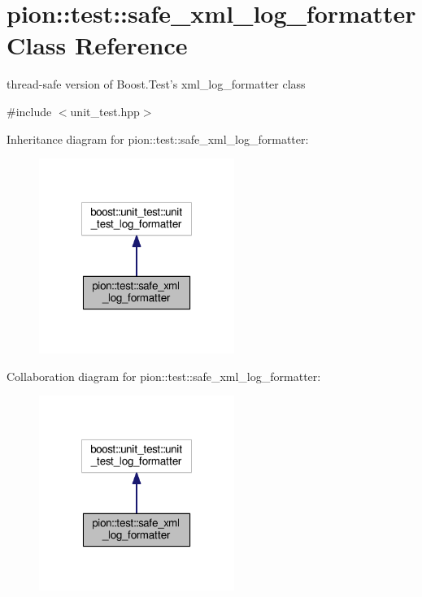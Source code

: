 \hypertarget{classpion_1_1test_1_1safe__xml__log__formatter}{\section{pion\-:\-:test\-:\-:safe\-\_\-xml\-\_\-log\-\_\-formatter Class Reference}
\label{classpion_1_1test_1_1safe__xml__log__formatter}
}


thread-\/safe version of Boost.\-Test's xml\-\_\-log\-\_\-formatter class  




{\ttfamily \#include $<$unit\-\_\-test.\-hpp$>$}



Inheritance diagram for pion\-:\-:test\-:\-:safe\-\_\-xml\-\_\-log\-\_\-formatter\-:
\nopagebreak
\begin{figure}[H]
\begin{center}
\leavevmode
\includegraphics[width=180pt]{classpion_1_1test_1_1safe__xml__log__formatter__inherit__graph}
\end{center}
\end{figure}


Collaboration diagram for pion\-:\-:test\-:\-:safe\-\_\-xml\-\_\-log\-\_\-formatter\-:
\nopagebreak
\begin{figure}[H]
\begin{center}
\leavevmode
\includegraphics[width=180pt]{classpion_1_1test_1_1safe__xml__log__formatter__coll__graph}
\end{center}
\end{figure}
